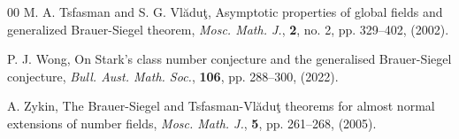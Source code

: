 \documentclass[12pt]{amsart}
\theoremstyle{definition}
\begin{document}
\begin{thebibliography}{00}
M. A. Tsfasman and S. G. Vl\u{a}du\c{t}, Asymptotic properties of global fields and generalized Brauer-Siegel theorem, {\it Mosc. Math. J.}, \textbf{2}, no. 2, pp. 329--402, (2002).

P. J. Wong, On Stark's class number conjecture and the generalised Brauer-Siegel conjecture, {\it Bull. Aust. Math. Soc.}, \textbf{106}, pp. 288--300, (2022).

A. Zykin, The Brauer-Siegel and Tsfasman-Vl\u{a}du\c{t} theorems for almost normal extensions of number fields, {\it Mosc. Math. J.}, \textbf{5}, pp. 261--268, (2005).













\end{thebibliography}
\end{document}
